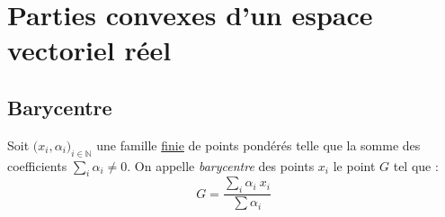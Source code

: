 \documentclass[11pt,a4paper,fleqn,pdftex]{report}
\begin{document}
\section{Parties convexes d'un espace vectoriel réel} %
\label{sec:parties_convexes_d_un_ev}
\subsection{Barycentre} %
\label{sub:barycentre}
\begin{dfn}[Barycentre]
     Soit $\big( x_i,\alpha_i\big)_{i\in \mathbb{N}}$ une famille \uline{finie} de points pondérés telle que la somme des coefficients $\sum_i \alpha_i \neq 0$. On appelle \emph{barycentre} des points $x_i$ le point $G$ tel que : 
     \begin{equation}
     G = \dfrac{\displaystyle\sum_i \alpha_i~x_i}{\sum \alpha_i}
     \end{equation}
\end{dfn}
\end{document}
